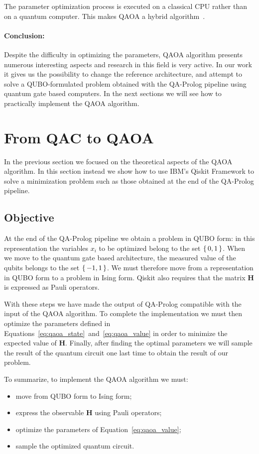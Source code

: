 The parameter optimization process is executed on a classical CPU rather than on a quantum computer. This makes QAOA a hybrid algorithm~\cite{fakhimi2023quantum}.

\paragraph{Conclusion:} Despite the difficulty in optimizing the parameters, QAOA algorithm presents numerous interesting aspects and research in this field is very active. In our work it gives us the possibility to change the reference architecture, and attempt to solve a QUBO-formulated problem \textemdash{}obtained with the QA-Prolog pipeline\textemdash{} using quantum gate based computers. In the next sections we will see how to practically implement the QAOA algorithm.

\section{From QAC to QAOA}
In the previous section we focused on the theoretical aspects of the QAOA algorithm. In this section instead we show how to use IBM's Qiskit Framework to solve a minimization problem such as those obtained at the end of the QA-Prolog pipeline.

\subsection{Objective}
At the end of the QA-Prolog pipeline we obtain a problem in QUBO form: in this representation the variables $x_i$ to be optimized belong to the set $\set{0, 1}$. When we move to the quantum gate based architecture, the measured value of the qubits belongs to the set $\set{-1, 1}$. We must therefore move from a representation in QUBO form to a problem in Ising form. Qiskit also requires that the matrix $\mathbf{H}$ is expressed as Pauli operators.

With these steps we have made the output of QA-Prolog compatible with the input of the QAOA algorithm. To complete the implementation we must then optimize the parameters defined in Equations~\ref{eq:qaoa_state}~and~\ref{eq:qaoa_value} in order to minimize the expected value of $\mathbf{H}$. Finally, after finding the optimal parameters we will sample the result of the quantum circuit one last time to obtain the result of our problem.

To summarize, to implement the QAOA algorithm we must:
\begin{itemize}
	\item move from QUBO form to Ising form;
	\item express the observable $\mathbf{H}$ using Pauli operators;
	\item optimize the parameters of Equation~\ref{eq:qaoa_value};
	\item sample the optimized quantum circuit.
\end{itemize}

